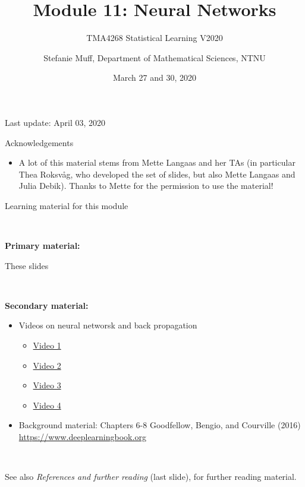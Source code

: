 \documentclass[10pt,ignorenonframetext,]{beamer}
\title{Module 11: Neural Networks}
\subtitle{TMA4268 Statistical Learning V2020}
\author{Stefanie Muff, Department of Mathematical Sciences, NTNU}
\date{March 27 and 30, 2020}
\providecommand{\tightlist}{%
  \setlength{\itemsep}{0pt}\setlength{\parskip}{0pt}}
\begin{document}
\frame{\titlepage}

\begin{frame}

Last update: April 03, 2020

\end{frame}

\begin{frame}{Acknowledgements}
\protect\hypertarget{acknowledgements}{}

\begin{itemize}
\tightlist
\item
  A lot of this material stems from Mette Langaas and her TAs (in
  particular Thea Roksv\aa g, who developed the set of slides, but also
  Mette Langaas and Julia Debik). Thanks to Mette for the permission to
  use the material!
\end{itemize}

\end{frame}

\begin{frame}

\begin{block}{Learning material for this module}

\(~\)

\textbf{Primary material:}

These slides

\(~\)

\textbf{Secondary material:} \vspace{2mm}

\begin{itemize}
\tightlist
\item
  Videos on neural networsk and back propagation

  \begin{itemize}
  \tightlist
  \item
    \href{https://www.youtube.com/watch?v=aircAruvnKk}{Video 1}
  \item
    \href{https://www.youtube.com/watch?v=IHZwWFHWa-w}{Video 2}
  \item
    \href{https://www.youtube.com/watch?v=Ilg3gGewQ5U}{Video 3}
  \item
    \href{https://www.youtube.com/watch?v=tIeHLnjs5U8}{Video 4}
  \end{itemize}
\end{itemize}

\vspace{2mm}

\begin{itemize}
\tightlist
\item
  Background material: Chapters 6-8 Goodfellow, Bengio, and Courville
  (2016) \url{https://www.deeplearningbook.org}
\end{itemize}

\(~\)

See also \emph{References and further reading} (last slide), for further
reading material.

\end{block}

\end{frame}
\end{document}
